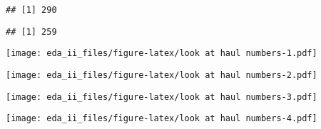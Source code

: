 \documentclass[
]{article}
\newenvironment{Shaded}{\begin{snugshade}}{\end{snugshade}}
\newcommand{\KeywordTok}[1]{\textcolor[rgb]{0.13,0.29,0.53}{\textbf{#1}}}
\newcommand{\NormalTok}[1]{#1}
\newcommand{\OperatorTok}[1]{\textcolor[rgb]{0.81,0.36,0.00}{\textbf{#1}}}
\begin{document}
\begin{verbatim}
## [1] 290
\end{verbatim}

\begin{Shaded}
\end{Shaded}

\begin{verbatim}
## [1] 259
\end{verbatim}

\begin{Shaded}
\end{Shaded}

\texttt{[image: eda\_ii\_files/figure-latex/look at haul numbers-1.pdf]}

\begin{Shaded}
\end{Shaded}

\texttt{[image: eda\_ii\_files/figure-latex/look at haul numbers-2.pdf]}

\begin{Shaded}
\end{Shaded}

\texttt{[image: eda\_ii\_files/figure-latex/look at haul numbers-3.pdf]}

\begin{Shaded}
\end{Shaded}

\texttt{[image: eda\_ii\_files/figure-latex/look at haul numbers-4.pdf]}
\end{document}
